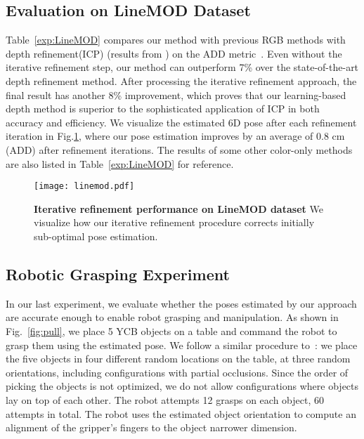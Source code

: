 \documentclass[10pt,twocolumn,letterpaper]{article}
\begin{document}
\subsection{Evaluation on LineMOD Dataset}

Table~\ref{exp:LineMOD} compares our method with previous RGB methods with depth refinement(ICP) (results from \cite{sundermeyer2018implicit, tekin18}) on the ADD metric~\cite{hinterstoisser2012model}. Even without the iterative refinement step, our method can outperform 7\% over the state-of-the-art depth refinement method. After processing the iterative refinement approach, the final result has another 8\% improvement, which proves that our learning-based depth method is superior to the sophisticated application of ICP in both accuracy and efficiency. We visualize the estimated 6D pose after each refinement iteration in Fig.\ref{fig:linemod}, where our pose estimation improves by an average of 0.8 cm (ADD) after  refinement iterations. The results of some other color-only methods are also listed in Table~\ref{exp:LineMOD} for reference.

\begin{figure}
	\centering
	\texttt{[image: linemod.pdf]}
	\caption{\textbf{Iterative refinement performance on LineMOD dataset} We visualize how our iterative refinement procedure corrects initially sub-optimal pose estimation.}
	\label{fig:linemod}
	\vspace{-10pt}
\end{figure}



\vspace{-5pt}
\subsection{Robotic Grasping Experiment}

In our last experiment, we evaluate whether the poses estimated by our approach are accurate enough to enable robot grasping and manipulation. As shown in Fig.~\ref{fig:pull}, we place 5 YCB objects on a table and command the robot to grasp them using the estimated pose. We follow a similar procedure to~\citet{tremblay2018deep}: we place the five objects in four different random locations on the table, at three random orientations, including configurations with partial occlusions. Since the order of picking the objects is not optimized, we do not allow configurations where objects lay on top of each other. The robot attempts 12 grasps on each object, 60 attempts in total. The robot uses the estimated object orientation to compute an alignment of the gripper's fingers to the object narrower dimension. 
\end{document}
